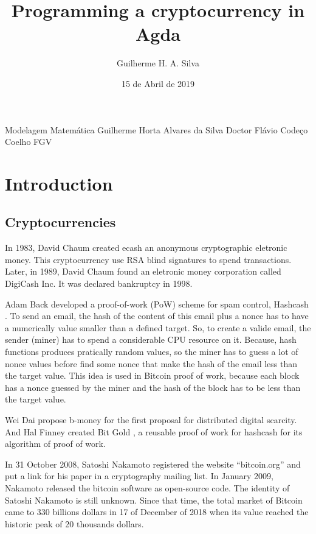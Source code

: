 \documentclass[12pt]{article}
\title{Programming a cryptocurrency in Agda}
\author{Guilherme H. A. Silva}
\date{15 de Abril de 2019}
\begin{document}

          {Modelagem Matemática}
          {Guilherme Horta Alvares da Silva}
          {Doctor Flávio Codeço Coelho}
          {FGV}


\tableofcontents
\pagebreak

\renewcommand{\thesection}{\arabic{section}}
\section{Introduction}

\subsection{Cryptocurrencies}

In 1983, David Chaum created ecash \cite{panurach1996money} an anonymous cryptographic eletronic money.
This cryptocurrency use RSA blind signatures \cite{chaum1983blind} to spend transactions.
Later, in 1989, David Chaum found an eletronic money corporation called DigiCash Inc.
It was declared bankruptcy in 1998.

Adam Back developed a proof-of-work (PoW) scheme for spam control, Hashcash \cite{back2002hashcash}.
To send an email, the hash of the content of this email plus a nonce has to have a numerically value
smaller than a defined target.
So, to create a valide email, the sender (miner) has to spend a considerable CPU resource on it.
Because, hash functions produces pratically random values, so the miner has to guess a lot of nonce
values before find some nonce that make the hash of the email less than the target value.
This idea is used in Bitcoin proof of work, because each block has a nonce guessed by the miner and
the hash of the block has to be less than the target value.

Wei Dai propose b-money \cite{dai1998b} for the first proposal for distributed digital scarcity.
And Hal Finney created Bit Gold \cite{wallace2011rise}, a reusable proof of work for hashcash for
its algorithm of proof of work.

In 31 October 2008, Satoshi Nakamoto registered the website ``bitcoin.org'' and put a link for his
paper \cite{nakamoto2008bitcoin} in a cryptography mailing list.
In January 2009, Nakamoto released the bitcoin software as open-source code.
The identity of Satoshi Nakamoto is still unknown.
Since that time, the total market of Bitcoin came to 330 billions dollars in 17 of December of 2018
when its value reached the historic peak of 20 thousands dollars.
\end{document}
